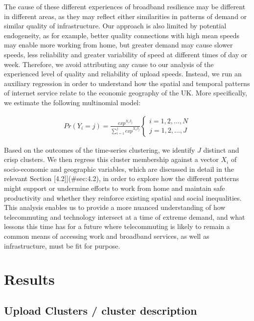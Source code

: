\documentclass[,]{sagej}
\begin{document}
The cause of these different experiences of broadband resilience may be
different in different areas, as they may reflect either similarities in
patterns of demand or similar quality of infrastructure. Our approach is
also limited by potential endogeneity, as for example, better quality
connections with high mean speeds may enable more working from home, but
greater demand may cause slower speeds, less reliability and greater
variability of speed at different times of day or week. Therefore, we
avoid attributing any cause to our analysis of the experienced level of
quality and reliability of upload speeds. Instead, we run an auxiliary
regression in order to understand how the spatial and temporal patterns
of internet service relate to the economic geography of the UK. More
specifically, we estimate the following multinomial model:

\begin{align}
Pr(Y_{i}=j) = \frac{exp^{X_{i}\beta_{j}}}{\sum_{i=1}^j exp^{X_{i}\beta_{j}}}
\begin{cases}
    i = 1, 2, ... , N \\  
    j = 1, 2, ... , J
\end{cases}\label{eq1}
\end{align}

Based on the outcomes of the time-series clustering, we identify \(J\)
distinct and crisp clusters. We then regress this cluster membership
against a vector \(X_{i}\) of socio-economic and geographic variables,
which are discussed in detail in the relevant Section
{[}4.2{]}{]}(\#sec:4.2), in order to explore how the different patterns
might support or undermine efforts to work from home and maintain safe
productivity and whether they reinforce existing spatial and social
inequalities. This analysis enables us to provide a more nuanced
understanding of how telecommuting and technology intersect at a time of
extreme demand, and what lessons this time has for a future where
telecommuting is likely to remain a common means of accessing work and
broadband services, as well as infrastructure, must be fit for purpose.

\hypertarget{sec:4}{%
\section{Results}\label{sec:4}}

\hypertarget{sec:4.1}{%
\subsection{Upload Clusters / cluster description}\label{sec:4.1}}
\end{document}
